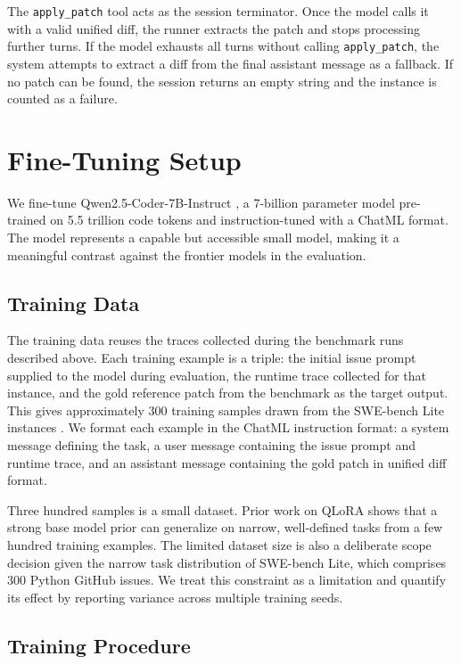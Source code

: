 The \texttt{apply\_patch} tool acts as the session terminator. Once the model calls it with a valid unified diff, the runner extracts the patch and stops processing further turns. If the model exhausts all turns without calling \texttt{apply\_patch}, the system attempts to extract a diff from the final assistant message as a fallback. If no patch can be found, the session returns an empty string and the instance is counted as a failure.


\section{Fine-Tuning Setup}
\label{sec:finetuning}

We fine-tune Qwen2.5-Coder-7B-Instruct \citep{hui2024qwen25coder}, a 7-billion parameter model pre-trained on 5.5 trillion code tokens and instruction-tuned with a ChatML format. The model represents a capable but accessible small model, making it a meaningful contrast against the frontier models in the evaluation.

\subsection{Training Data}

The training data reuses the traces collected during the benchmark runs described above. Each training example is a triple: the initial issue prompt supplied to the model during evaluation, the runtime trace collected for that instance, and the gold reference patch from the benchmark as the target output. This gives approximately 300 training samples drawn from the SWE-bench Lite instances \citep{jimenez2023swebench}. We format each example in the ChatML instruction format: a system message defining the task, a user message containing the issue prompt and runtime trace, and an assistant message containing the gold patch in unified diff format.

Three hundred samples is a small dataset. Prior work on QLoRA \citep{dettmers2023qlora} shows that a strong base model prior can generalize on narrow, well-defined tasks from a few hundred training examples. The limited dataset size is also a deliberate scope decision given the narrow task distribution of SWE-bench Lite, which comprises 300 Python GitHub issues. We treat this constraint as a limitation and quantify its effect by reporting variance across multiple training seeds.

\subsection{Training Procedure}

